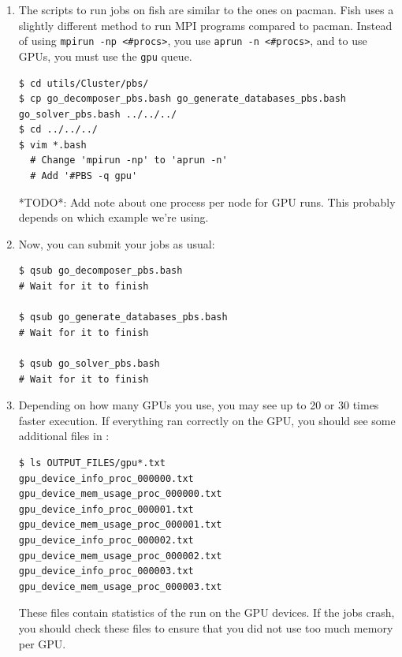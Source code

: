 \documentclass[10pt,fleqn,letterpaper]{article}
\begin{document}
\begin{enumerate}
\item The scripts to run jobs on fish are similar to the ones on pacman. Fish
      uses a slightly different method to run MPI programs compared to pacman.
      Instead of using \texttt{mpirun -np <\#procs>}, you use
      \texttt{aprun -n <\#procs>}, and to use GPUs, you must use the \texttt{gpu}
      queue.
\begin{lstlisting}
$ cd utils/Cluster/pbs/
$ cp go_decomposer_pbs.bash go_generate_databases_pbs.bash go_solver_pbs.bash ../../../
$ cd ../../../
$ vim *.bash
  # Change 'mpirun -np' to 'aprun -n'
  # Add '#PBS -q gpu'
\end{lstlisting}
*TODO*: Add note about one process per node for GPU runs. This probably depends
on which example we're using.

\item Now, you can submit your jobs as usual:
\begin{lstlisting}
$ qsub go_decomposer_pbs.bash
# Wait for it to finish

$ qsub go_generate_databases_pbs.bash
# Wait for it to finish

$ qsub go_solver_pbs.bash
# Wait for it to finish
\end{lstlisting}

\item Depending on how many GPUs you use, you may see up to 20 or 30 times
      faster execution. If everything ran correctly on the GPU, you should see
      some additional files in :
\begin{lstlisting}
$ ls OUTPUT_FILES/gpu*.txt
gpu_device_info_proc_000000.txt
gpu_device_mem_usage_proc_000000.txt
gpu_device_info_proc_000001.txt
gpu_device_mem_usage_proc_000001.txt
gpu_device_info_proc_000002.txt
gpu_device_mem_usage_proc_000002.txt
gpu_device_info_proc_000003.txt
gpu_device_mem_usage_proc_000003.txt
\end{lstlisting}

      These files contain statistics of the run on the GPU devices. If the jobs
      crash, you should check these files to ensure that you did not use too
      much memory per GPU.
\end{enumerate}


%
%

\end{document}

